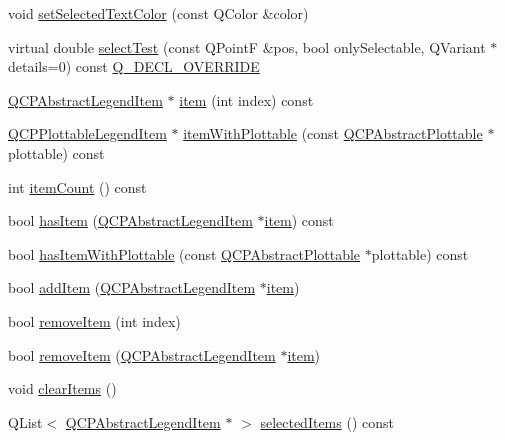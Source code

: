 \begin{DoxyCompactItemize}
\item 
void \hyperlink{class_q_c_p_legend_a7674dfc7a1f30e1abd1018c0ed45e0bc}{set\+Selected\+Text\+Color} (const Q\+Color \&color)
\item 
virtual double \hyperlink{class_q_c_p_legend_aa53507624491908fb3d1a514b1fc674e}{select\+Test} (const Q\+PointF \&pos, bool only\+Selectable, Q\+Variant $\ast$details=0) const \hyperlink{qcustomplot_8hh_a42cc5eaeb25b85f8b52d2a4b94c56f55}{Q\+\_\+\+D\+E\+C\+L\+\_\+\+O\+V\+E\+R\+R\+I\+DE}
\item 
\hyperlink{class_q_c_p_abstract_legend_item}{Q\+C\+P\+Abstract\+Legend\+Item} $\ast$ \hyperlink{class_q_c_p_legend_a454272d7094437beb3278a2294006da5}{item} (int index) const 
\item 
\hyperlink{class_q_c_p_plottable_legend_item}{Q\+C\+P\+Plottable\+Legend\+Item} $\ast$ \hyperlink{class_q_c_p_legend_a5ee80cf83f65e3b6dd386942ee3cc1ee}{item\+With\+Plottable} (const \hyperlink{class_q_c_p_abstract_plottable}{Q\+C\+P\+Abstract\+Plottable} $\ast$plottable) const 
\item 
int \hyperlink{class_q_c_p_legend_a198228e9cdc78d3a3c306fa6763d0404}{item\+Count} () const 
\item 
bool \hyperlink{class_q_c_p_legend_a380dd19eb631592e1ebb9b24cc5b398a}{has\+Item} (\hyperlink{class_q_c_p_abstract_legend_item}{Q\+C\+P\+Abstract\+Legend\+Item} $\ast$\hyperlink{class_q_c_p_legend_a454272d7094437beb3278a2294006da5}{item}) const 
\item 
bool \hyperlink{class_q_c_p_legend_a2eb1d24bdf5658e64962a656303fd61a}{has\+Item\+With\+Plottable} (const \hyperlink{class_q_c_p_abstract_plottable}{Q\+C\+P\+Abstract\+Plottable} $\ast$plottable) const 
\item 
bool \hyperlink{class_q_c_p_legend_a3ab274de52d2951faea45a6d975e6b3f}{add\+Item} (\hyperlink{class_q_c_p_abstract_legend_item}{Q\+C\+P\+Abstract\+Legend\+Item} $\ast$\hyperlink{class_q_c_p_legend_a454272d7094437beb3278a2294006da5}{item})
\item 
bool \hyperlink{class_q_c_p_legend_ac91595c3eaa746fe6321d2eb952c63bb}{remove\+Item} (int index)
\item 
bool \hyperlink{class_q_c_p_legend_a2aea4ec6da2d454dd0b241a254d65082}{remove\+Item} (\hyperlink{class_q_c_p_abstract_legend_item}{Q\+C\+P\+Abstract\+Legend\+Item} $\ast$\hyperlink{class_q_c_p_legend_a454272d7094437beb3278a2294006da5}{item})
\item 
void \hyperlink{class_q_c_p_legend_a24795c7250eb5214fcea16b7217b4dfb}{clear\+Items} ()
\item 
Q\+List$<$ \hyperlink{class_q_c_p_abstract_legend_item}{Q\+C\+P\+Abstract\+Legend\+Item} $\ast$ $>$ \hyperlink{class_q_c_p_legend_ac93eaf236e911d67aa8b88942ef45c5e}{selected\+Items} () const 
\end{DoxyCompactItemize}
